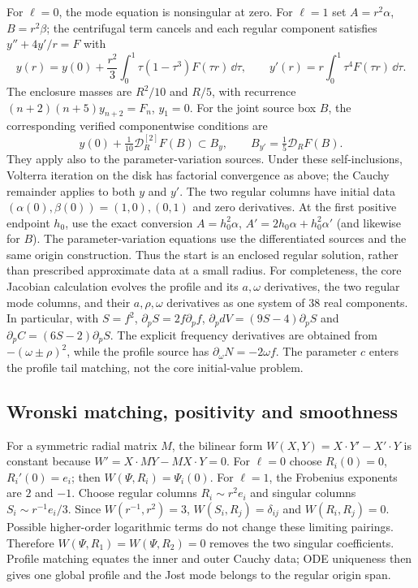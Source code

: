 For $\ell=0$, the mode equation is nonsingular at zero.
For $\ell=1$ set $A=r^2\alpha$, $B=r^2\beta$; the centrifugal term
cancels and each regular component satisfies $y''+4y'/r=F$ with
\begin{equation}
 y(r)=y(0)+\frac{r^2}{3}\int_0^1\tau(1-\tau^3)F(\tau r)\,\dd\tau,
 \qquad y'(r)=r\int_0^1\tau^4F(\tau r)\,\dd\tau.
\end{equation}
The enclosure masses are $R^2/10$ and $R/5$, with recurrence
$(n+2)(n+5)y_{n+2}=F_n$, $y_1=0$. For the joint source box $B$,
the corresponding verified componentwise conditions are
\begin{equation}
 y(0)+\tfrac1{10}\mathcal D_R^{[2]}F(B)\subset B_y,
 \qquad B_{y'}=\tfrac15\mathcal D_R F(B).
\end{equation}
They apply also to the parameter-variation sources. Under these
self-inclusions, Volterra iteration on the disk
has factorial convergence as above; the Cauchy remainder applies to
both $y$ and $y'$. The two regular columns have initial data
$(\alpha(0),\beta(0))=(1,0),(0,1)$ and zero derivatives.
At the first positive endpoint $h_0$, use the exact conversion
$A=h_0^2\alpha$, $A'=2h_0\alpha+h_0^2\alpha'$ (and likewise for $B$).
The parameter-variation equations use the differentiated sources and
the same origin construction. Thus the start is an enclosed regular
solution, rather than prescribed approximate data at a small radius.
For completeness, the core Jacobian calculation evolves the profile
and its $a,\omega$ derivatives, the two regular mode columns, and
their $a,\rho,\omega$ derivatives as one system of 38 real components.
In particular, with $S=f^2$,
$\partial_pS=2f\partial_pf$,
$\partial_pdV=(9S-4)\partial_pS$ and
$\partial_pC=(6S-2)\partial_pS$. The explicit frequency derivatives
are obtained from $-(\omega\pm\rho)^2$, while the profile source
has $\partial_\omega N=-2\omega f$. The parameter $c$ enters the
profile tail matching, not the core initial-value problem.

\subsection{Wronski matching, positivity and smoothness}
\label{supp:matching-positive}
For a symmetric radial matrix $M$, the bilinear form
$W(X,Y)=X\cdot Y'-X'\cdot Y$ is constant because
$W'=X\cdot MY-MX\cdot Y=0$. For $\ell=0$ choose
$R_i(0)=0$, $R_i'(0)=e_i$; then $W(\Psi,R_i)=\Psi_i(0)$.
For $\ell=1$, the Frobenius exponents are $2$ and $-1$. Choose regular
columns $R_i\sim r^2e_i$ and singular columns $S_i\sim r^{-1}e_i/3$.
Since $W(r^{-1},r^2)=3$, $W(S_i,R_j)=\delta_{ij}$ and
$W(R_i,R_j)=0$. Possible higher-order logarithmic terms do not change
these limiting pairings. Therefore $W(\Psi,R_1)=W(\Psi,R_2)=0$
removes the two singular coefficients. Profile matching equates the
inner and outer Cauchy data; ODE uniqueness then gives one global
profile and the Jost mode belongs to the regular origin span.

